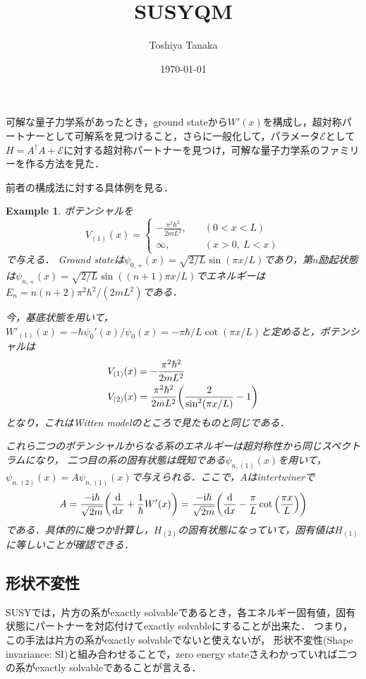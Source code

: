 \documentclass[english, dvipdfmx, a4paper]{jsarticle}
\title{SUSYQM}
\author{Toshiya Tanaka}
\date{\today}
\theoremstyle{break}
\newtheorem{eg}[thm]{Example}
\renewcommand{\i}{\mathrm{i}}
\begin{document}
	可解な量子力学系があったとき，ground stateから$W'(x)$を構成し，超対称パートナーとして可解系を見つけること，さらに一般化して，パラメータ$\mathcal{E}$として$H = A^{\dagger}A + \mathcal{E}$に対する超対称パートナーを見つけ，可解な量子力学系のファミリーを作る方法を見た．
	
	前者の構成法に対する具体例を見る．
	\begin{eg}
		ポテンシャルを
		\begin{equation}
			V_{(1)} (x) = 
			\begin{cases}
				-\displaystyle\frac{\pi^2\hbar^2}{2mL^2}, \quad &(0 < x < L)\\
				\infty, &(x > 0,\ L < x)
			\end{cases}
		\end{equation}
		で与える．
		Ground stateは$\psi_{0, +} (x) = \sqrt{2/L}\sin(\pi x/L)$であり，第$n$励起状態は$\psi_{n, +}(x) = \sqrt{2/L}\sin((n+1)\pi x/L)$でエネルギーは$E_{n} = n(n+2)\pi^2\hbar^2/(2mL^2)$である．

		今，基底状態を用いて，$W'_{(1)}(x) = -\hbar \psi_0'(x)/\psi_0(x) = -\pi\hbar/L\cot(\pi x/L) $と定めると，ポテンシャルは
		\begin{align}
			V_{(1)}(x) &= -\frac{\pi^2\hbar^2}{2mL^2}\\
			V_{(2)} (x) &= \frac{\pi^2\hbar^2}{2mL^2}\qty(\frac{2}{\sin^2(\pi x/L)} - 1)
		\end{align}
		となり，これはWitten modelのところで見たものと同じである．

		これら二つのポテンシャルからなる系のエネルギーは超対称性から同じスペクトラムになり，
		二つ目の系の固有状態は既知である$\psi_{n, (1)}(x)$を用いて，
		$\psi_{n, (2)} (x) = A\psi_{n, (1)}(x)$で与えられる．ここで，$A$はintertwinerで
		\begin{equation}
			A = \frac{-\i\hbar}{\sqrt{2m}}\qty(\dv{}{x}+\frac{1}{\hbar}W'(x))
			 = \frac{-\i\hbar}{\sqrt{2m}}\qty(\dv{}{x} - \frac{\pi}{L}\cot\qty(\frac{\pi x}{L}))
		\end{equation}
		である．具体的に幾つか計算し，$H_{(2)}$の固有状態になっていて，固有値は$H_{(1)}$に等しいことが確認できる．
	\end{eg}

	\subsection{形状不変性}
	SUSYでは，片方の系がexactly solvableであるとき，各エネルギー固有値，固有状態にパートナーを対応付けてexactly solvableにすることが出来た．
	つまり，この手法は片方の系がexactly solvableでないと使えないが，
	形状不変性(Shape invariance: SI)と組み合わせることで，zero energy stateさえわかっていれば二つの系がexactly solvableであることが言える．
\end{document}
